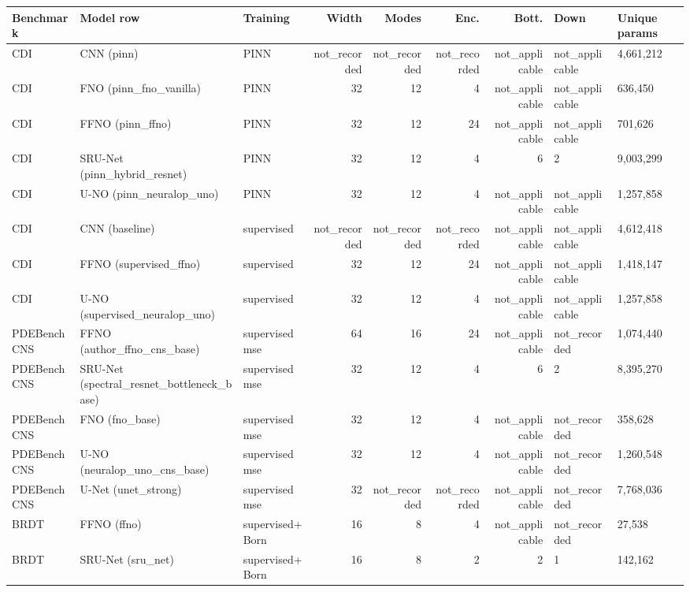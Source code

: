 \begin{tabular}{lllrrrrll}
\toprule
Benchmark & Model row & Training & Width & Modes & Enc. & Bott. & Down & Unique params \\
\midrule
CDI & CNN (pinn) & PINN & not\_recorded & not\_recorded & not\_recorded & not\_applicable & not\_applicable & 4,661,212 \\
CDI & FNO (pinn\_fno\_vanilla) & PINN & 32 & 12 & 4 & not\_applicable & not\_applicable & 636,450 \\
CDI & FFNO (pinn\_ffno) & PINN & 32 & 12 & 24 & not\_applicable & not\_applicable & 701,626 \\
CDI & SRU-Net (pinn\_hybrid\_resnet) & PINN & 32 & 12 & 4 & 6 & 2 & 9,003,299 \\
CDI & U-NO (pinn\_neuralop\_uno) & PINN & 32 & 12 & 4 & not\_applicable & not\_applicable & 1,257,858 \\
CDI & CNN (baseline) & supervised & not\_recorded & not\_recorded & not\_recorded & not\_applicable & not\_applicable & 4,612,418 \\
CDI & FFNO (supervised\_ffno) & supervised & 32 & 12 & 24 & not\_applicable & not\_applicable & 1,418,147 \\
CDI & U-NO (supervised\_neuralop\_uno) & supervised & 32 & 12 & 4 & not\_applicable & not\_applicable & 1,257,858 \\
\midrule
PDEBench CNS & FFNO (author\_ffno\_cns\_base) & supervised mse & 64 & 16 & 24 & not\_applicable & not\_recorded & 1,074,440 \\
PDEBench CNS & SRU-Net (spectral\_resnet\_bottleneck\_base) & supervised mse & 32 & 12 & 4 & 6 & 2 & 8,395,270 \\
PDEBench CNS & FNO (fno\_base) & supervised mse & 32 & 12 & 4 & not\_applicable & not\_recorded & 358,628 \\
PDEBench CNS & U-NO (neuralop\_uno\_cns\_base) & supervised mse & 32 & 12 & 4 & not\_applicable & not\_recorded & 1,260,548 \\
PDEBench CNS & U-Net (unet\_strong) & supervised mse & 32 & not\_recorded & not\_recorded & not\_applicable & not\_recorded & 7,768,036 \\
\midrule
BRDT & FFNO (ffno) & supervised+Born & 16 & 8 & 4 & not\_applicable & not\_recorded & 27,538 \\
BRDT & SRU-Net (sru\_net) & supervised+Born & 16 & 8 & 2 & 2 & 1 & 142,162 \\
\bottomrule
\end{tabular}
